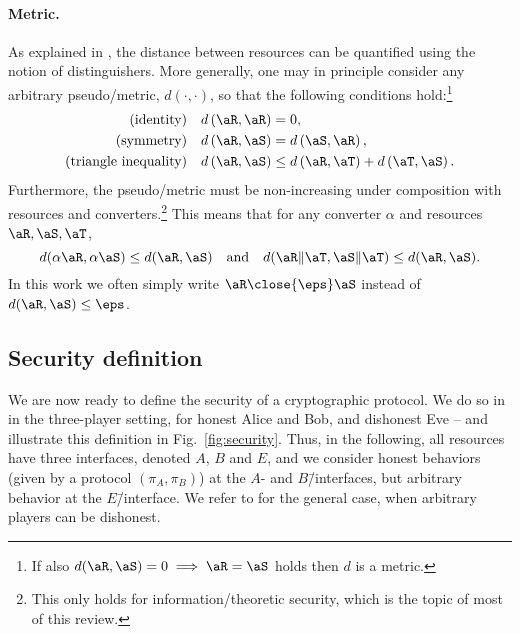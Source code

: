   \paragraph{Metric.} As explained in , the
  distance between resources can be quantified using the notion of
  distinguishers. More generally, one may in principle
  consider any arbitrary pseudo\-/metric, $d(\cdot,\cdot)$, so that
  the following conditions hold:\footnote{If also
    $d(\aR,\aS) = 0 \implies \aR=\aS$ holds then $d$ is a metric.}
\begin{align*} \text{(identity)} & &
  d\left(\aR,\aR\right) & = 0, \\ %
  \text{(symmetry)} & & d\left(\aR,\aS\right) & =
  d\left(\aS,\aR\right), \\ %
  \text{(triangle inequality)} & & d\left(\aR,\aS\right)
  & \leq d\left(\aR,\aT\right) +
  d\left(\aT,\aS\right). %
\end{align*} Furthermore, the pseudo\-/metric must be non-increasing
under composition with resources and converters.\footnote{This only
  holds for information\-/theoretic security, which is the topic of
  most of this review.} This means that for any converter $\alpha$ and
resources $\aR,\aS,\aT$,
\begin{equation*} %
d(\alpha\aR,\alpha\aS)
  \leq d(\aR,\aS) \quad \text{and} \quad d(\aR\|\aT,\aS\|\aT) \leq
  d(\aR,\aS). \end{equation*}
In this work we often simply write $\aR \close{\eps} \aS$ instead of
$d(\aR,\aS) \leq \eps$.


\subsection{Security definition}
\label{sec:ac.security}

We are now ready to define the security of a cryptographic
protocol. We do so in  in the three-player
setting, for honest Alice and Bob, and dishonest Eve \--- and
illustrate this definition in Fig.~\ref{fig:security}. Thus, in the
following, all resources have three interfaces, denoted $A$, $B$ and
$E$, and we consider honest behaviors (given by a protocol
$(\pi_A,\pi_B)$) at the $A$- and $B$\=/interfaces, but arbitrary
behavior at the $E$\=/interface. We refer to \textcite{MR11} for the
general case, when arbitrary players can be dishonest.

